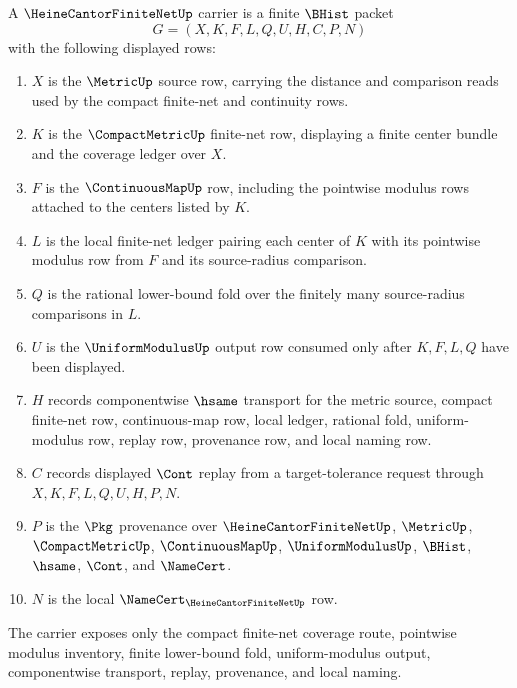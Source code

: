 \begin{definition}
\label{def:heine-cantor-finite-net-carrier}
A $\HeineCantorFiniteNetUp$ carrier is a finite $\BHist$ packet
$$
G=(X,K,F,L,Q,U,H,C,P,N)
$$
with the following displayed rows:
\begin{enumerate}
\item $X$ is the $\MetricUp$ source row, carrying the distance and comparison reads used by the compact finite-net and continuity rows.
\item $K$ is the $\CompactMetricUp$ finite-net row, displaying a finite center bundle and the coverage ledger over $X$.
\item $F$ is the $\ContinuousMapUp$ row, including the pointwise modulus rows attached to the centers listed by $K$.
\item $L$ is the local finite-net ledger pairing each center of $K$ with its pointwise modulus row from $F$ and its source-radius comparison.
\item $Q$ is the rational lower-bound fold over the finitely many source-radius comparisons in $L$.
\item $U$ is the $\UniformModulusUp$ output row consumed only after $K,F,L,Q$ have been displayed.
\item $H$ records componentwise $\hsame$ transport for the metric source, compact finite-net row, continuous-map row, local ledger, rational fold, uniform-modulus row, replay row, provenance row, and local naming row.
\item $C$ records displayed $\Cont$ replay from a target-tolerance request through $X,K,F,L,Q,U,H,P,N$.
\item $P$ is the $\Pkg$ provenance over $\HeineCantorFiniteNetUp$, $\MetricUp$, $\CompactMetricUp$, $\ContinuousMapUp$, $\UniformModulusUp$, $\BHist$, $\hsame$, $\Cont$, and $\NameCert$.
\item $N$ is the local $\NameCert_{\HeineCantorFiniteNetUp}$ row.
\end{enumerate}
The carrier exposes only the compact finite-net coverage route, pointwise modulus inventory, finite lower-bound fold, uniform-modulus output, componentwise transport, replay, provenance, and local naming.
\end{definition}

